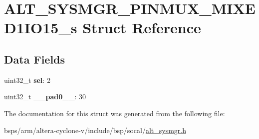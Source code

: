 \hypertarget{structALT__SYSMGR__PINMUX__MIXED1IO15__s}{}\section{A\+L\+T\+\_\+\+S\+Y\+S\+M\+G\+R\+\_\+\+P\+I\+N\+M\+U\+X\+\_\+\+M\+I\+X\+E\+D1\+I\+O15\+\_\+s Struct Reference}
\label{structALT__SYSMGR__PINMUX__MIXED1IO15__s}
\subsection*{Data Fields}
\begin{DoxyCompactItemize}
\item 
\mbox{\label{structALT__SYSMGR__PINMUX__MIXED1IO15__s_ac755f21e50ff24d5938ded227ebf1857}} 
uint32\+\_\+t {\bfseries sel}\+: 2
\item 
\mbox{\label{structALT__SYSMGR__PINMUX__MIXED1IO15__s_ae87690a6102a200d776238f8b61f5506}} 
uint32\+\_\+t {\bfseries \+\_\+\+\_\+pad0\+\_\+\+\_\+}\+: 30
\end{DoxyCompactItemize}


The documentation for this struct was generated from the following file\+:\begin{DoxyCompactItemize}
\item 
bsps/arm/altera-\/cyclone-\/v/include/bsp/socal/\mbox{\hyperlink{alt__sysmgr_8h}{alt\+\_\+sysmgr.\+h}}\end{DoxyCompactItemize}
